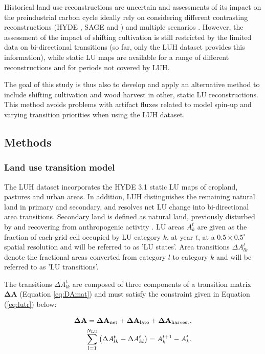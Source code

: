 Historical land use reconstructions are uncertain \citep{gaillard10cp} and assessments of its impact on the preindustrial carbon cycle ideally rely on considering different contrasting reconstructions (HYDE \citep{kleingoldewijk2011geb}, SAGE \citep{ramankutty1999gbc} and \citet{kaplan11}) and multiple scenarios \citep{stocker11bg}. However, the assessment of the impact of shifting cultivation is still restricted by the limited data on bi-directional transitions (so far, only the LUH dataset provides this information), while static LU maps are available for a range of different reconstructions \citep{kleingoldewijk2011geb,pongratz08gbc,kaplan11} and for periods not covered by LUH.

The goal of this study is thus also to develop and apply an alternative method to include shifting cultivation and wood harvest in other, static LU reconstructions. This method avoids problems with artifact fluxes related to model spin-up and varying transition priorities when using the LUH dataset.

\subsection*{Methods}
\subsubsection*{Land use transition model}
The LUH dataset incorporates the HYDE 3.1 static LU maps of cropland, pastures and urban areas. In addition, LUH distinguishes the remaining natural land in primary and secondary, and resolves net LU change into bi-directional area transitions. Secondary land is defined as natural land, previously disturbed by and recovering from anthropogenic activity \citep{hurtt06gcb}. LU areas $A_k^t$ are given as the fraction of each grid cell occupied by LU category $k$, at year $t$, at a $0.5\times0.5^{\circ}$ spatial resolution and will be referred to as 'LU states'. Area transitions $\Delta A_{lk}^t$ denote the fractional areas converted from category $l$ to category $k$ and will be referred to as 'LU transitions'. %

The transitions $\Delta A_{lk}^t$ are composed of three components of a transition matrix $\mathbf{\Delta A}$ (Equation \ref{eq:DAmat}) and must satisfy the constraint given in Equation (\ref{eq:lutr}) below:

\begin{eqnarray}
 \mathbf{\Delta A} = \mathbf{\Delta A}_{\mbox{\scriptsize net}} + \mathbf{\Delta A}_{\mbox{\scriptsize lato}} + \mathbf{\Delta A}_{\mbox{\scriptsize harvest}}, \label{eq:DAmat}\\
 \sum_{l=1}^{N_{\mbox{\tiny LU}}} \left(\Delta A_{lk}^t - \Delta A_{kl}^t \right) = A_{k}^{t+1} - A_k^t. \label{eq:lutr}
\end{eqnarray}

